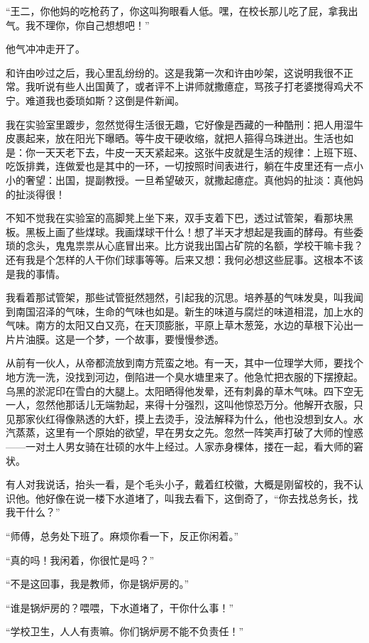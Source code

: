  “王二，你他妈的吃枪药了，你这叫狗眼看人低。嘿，在校长那儿吃了屁，拿我出气。我不理你，你自己想想吧！” 
 
 他气冲冲走开了。 
 
 和许由吵过之后，我心里乱纷纷的。这是我第一次和许由吵架，这说明我很不正常。我听说有些人出国黄了，或者评不上讲师就撒癔症，骂孩子打老婆搅得鸡犬不宁。难道我也委琐如斯？这倒是件新闻。 
 
 我在实验室里踱步，忽然觉得生活很无趣，它好像是西藏的一种酷刑：把人用湿牛皮裹起来，放在阳光下曝晒。等牛皮干硬收缩，就把人箍得乌珠迸出。生活也如是：你一天天老下去，牛皮一天天紧起来。这张牛皮就是生活的规律：上班下班、吃饭排粪，连做爱也是其中的一环，一切按照时间表进行，躺在牛皮里还有一点小小的奢望：出国，提副教授。一旦希望破灭，就撒起癔症。真他妈的扯淡：真他妈的扯淡得很！ 
 
 不知不觉我在实验室的高脚凳上坐下来，双手支着下巴，透过试管架，看那块黑板。黑板上画了些煤球。我画煤球干什么！想了半天才想起是我画的酵母。有些委琐的念头，鬼鬼祟祟从心底冒出来。比方说我出国占矿院的名额，学校干嘛卡我？还有我是个怎样的人干你们球事等等。后来又想：我何必想这些屁事。这根本不该是我的事情。 
 
 我看着那试管架，那些试管挺然翘然，引起我的沉思。培养基的气味发臭，叫我闻到南国沼泽的气味，生命的气味也如是。新生的味道与腐烂的味道相混，加上水的气味。南方的太阳又白又亮，在天顶膨胀，平原上草木葱笼，水边的草根下沁出一片片油膜。这是一个梦，一个故事，要慢慢参透。 
 
 从前有一伙人，从帝都流放到南方荒蛮之地。有一天，其中一位理学大师，要找个地方洗一洗，没找到河边，倒陷进一个臭水塘里来了。他急忙把衣服的下摆撩起。乌黑的淤泥印在雪白的大腿上。太阳晒得他发晕，还有刺鼻的草木气味。四下空无一人，忽然他那话儿无端勃起，来得十分强烈，这叫他惊恐万分。他解开衣服，只见那家伙红得像熟透的大虾，摸上去烫手，没法解释为什么，他也没想到女人。水汽蒸蒸，这里有一个原始的欲望，早在男女之先。忽然一阵笑声打破了大师的惶惑——一对土人男女骑在壮硕的水牛上经过。人家赤身棵体，搂在一起，看大师的窘状。 
 
 有人对我说话，抬头一看，是个毛头小子，戴着红校徽，大概是刚留校的，我不认识他。他好像在说一楼下水道堵了，叫我去看下，这倒奇了，“你去找总务长，找我干什么？” 
 
 “师傅，总务处下班了。麻烦你看一下，反正你闲着。” 
 
 “真的吗！我闲着，你很忙是吗？” 
 
 “不是这回事，我是教师，你是锅炉房的。” 
 
 “谁是锅炉房的？喂喂，下水道堵了，干你什么事！” 
 
 “学校卫生，人人有责嘛。你们锅炉房不能不负责任！” 
 
